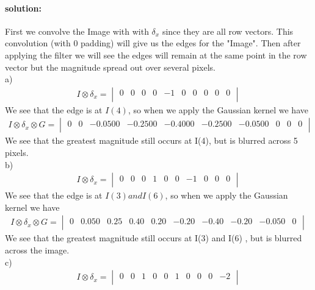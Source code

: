 \documentclass[11pt,english]{article}
\begin{document}
\paragraph{solution:}
First we convolve the Image with with $\delta_x$ since they are all row vectors. This convolution (with 0 padding)  will give us the edges for the "Image". Then after applying the filter we will see the edges will remain at the same point in the row vector but the magnitude spread out over several pixels. 
\\
a) 
\begin{align*}
 I \otimes \delta_x  = 
 \begin{vmatrix}
  0 &    0  &   0  &   0   & -1   &  0  &   0  &   0 &    0  &   0  \\ 
\end{vmatrix}    
\end{align*}
We see that the edge is at $I(4)$, so when we apply the Gaussian kernel we have 
    \begin{align*}
 I \otimes \delta_x \otimes G = 
 \begin{vmatrix}
      0  &       0 &  -0.0500  & -0.2500  & -0.4000 &  -0.2500  & -0.0500   &    0   &   0  &   0  \\ 
\end{vmatrix}    
\end{align*}
We see that the greatest magnitude still occurs at I(4), but is blurred across 5 pixels. 
\\
b) 
\\
\begin{align*}
 I \otimes \delta_x  = 
 \begin{vmatrix}
   0  &   0   &  0   &  1 &    0&     0   & -1   &  0   &  0   &0\\ 
\end{vmatrix}    
\end{align*}
We see that the edge is at $ I(3) and I(6)$, so when we apply the Gaussian kernel we have 
    \begin{align*}
 I \otimes \delta_x \otimes G = 
 \begin{vmatrix}
      0  &  0.050 &  0.25 &  0.40  &  0.20  & -0.20  & -0.40  & -0.20 &  -0.050   &  0\\
\end{vmatrix}    
\end{align*}
We see that the greatest magnitude still occurs at I(3) and I(6) , but is blurred across the image. 
\\
c)
\\
\begin{align*}
 I \otimes \delta_x  = 
 \begin{vmatrix}
        0  &   0  &   1  &   0 &    0  &   1  &   0   &  0  &   0   & -2\\ 
\end{vmatrix}    
\end{align*}
\end{document}
